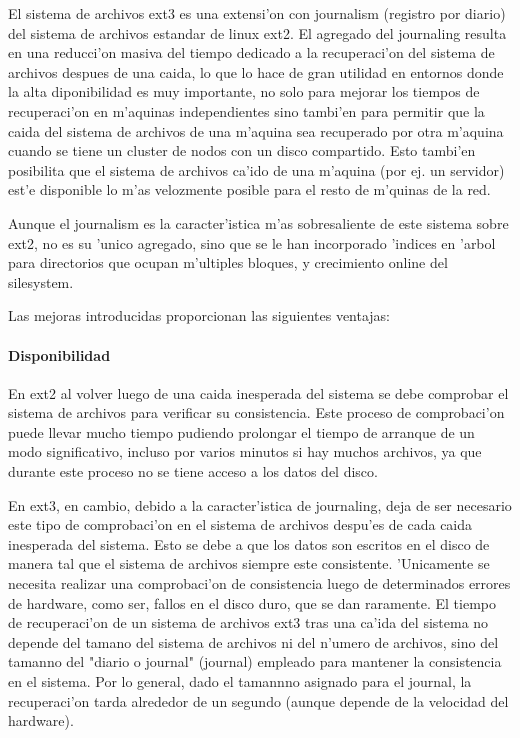 El sistema de archivos ext3 es una extensi'on con journalism (registro por diario) del sistema de archivos estandar de linux ext2. El agregado del journaling resulta en una reducci'on masiva del tiempo dedicado a la recuperaci'on del sistema de archivos despues de una caida, lo que lo hace de gran utilidad en entornos donde la alta diponibilidad es muy importante, no solo para mejorar los tiempos de recuperaci'on en m'aquinas independientes sino tambi'en para permitir que la caida del sistema de archivos de una m'aquina sea recuperado por otra m'aquina cuando se tiene un cluster de nodos con un disco compartido. Esto tambi'en posibilita que el sistema de archivos ca'ido de una m'aquina (por ej. un servidor) est'e disponible lo m'as velozmente posible para el resto de m'quinas de la red.

Aunque el journalism es la caracter'istica m'as sobresaliente de este sistema sobre ext2, no es su 'unico agregado, sino que se le han incorporado 'indices en 'arbol para directorios que ocupan m'ultiples bloques, y crecimiento online del silesystem.

Las mejoras introducidas proporcionan las siguientes ventajas:
\paragraph{Disponibilidad}
En ext2 al volver luego de una caida inesperada del sistema se debe comprobar el sistema de archivos para verificar su consistencia. Este proceso de comprobaci'on puede llevar mucho tiempo pudiendo prolongar el tiempo de arranque de un modo significativo, incluso por varios minutos si hay muchos archivos, ya que durante este proceso no se tiene acceso a los datos del disco.

En ext3, en cambio, debido a la caracter'istica de journaling, deja de ser necesario este tipo de comprobaci'on en el sistema de archivos despu'es de cada caida inesperada del sistema. Esto se debe a que los datos son escritos en el disco de manera tal que el sistema de archivos siempre este consistente. 'Unicamente se necesita realizar una comprobaci'on de consistencia luego de determinados errores de hardware, como ser, fallos en el disco duro, que se dan raramente.
El tiempo de recuperaci'on de un sistema de archivos ext3 tras una ca'ida del sistema no depende del tamano del sistema de archivos ni del n'umero de archivos, sino del tamanno del "diario o journal" (journal) empleado para mantener la consistencia en el sistema. Por lo general, dado el tamannno asignado para el journal, la recuperaci'on tarda alrededor de un segundo (aunque depende de la velocidad del hardware).
